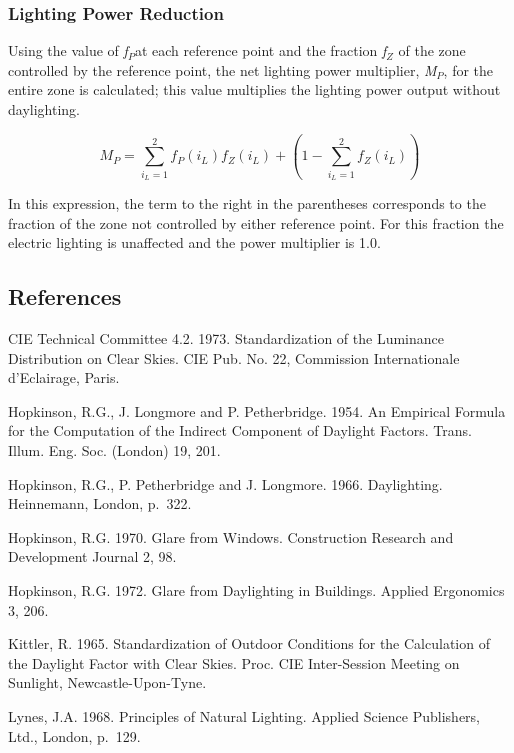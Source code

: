 \subsubsection{Lighting Power Reduction}\label{lighting-power-reduction}

Using the value of \emph{f\(_{P}\)}at each reference point and the fraction \emph{f\(_{Z}\)} of the zone controlled by the reference point, the net lighting power multiplier, \emph{M\(_{P}\)}, for the entire zone is calculated; this value multiplies the lighting power output without daylighting.

\begin{equation}
{M_P} = \sum\limits_{{i_L} = 1}^2 {{f_P}({i_L})} {f_Z}({i_L}) + \left( {1 - \sum\limits_{{i_L} = 1}^2 {} {f_Z}({i_L})} \right)
\end{equation}

In this expression, the term to the right in the parentheses corresponds to the fraction of the zone not controlled by either reference point. For this fraction the electric lighting is unaffected and the power multiplier is 1.0.

\subsection{References}\label{references-045}

CIE Technical Committee 4.2. 1973. Standardization of the Luminance Distribution on Clear Skies. CIE Pub. No. 22, Commission Internationale d'Eclairage, Paris.

Hopkinson, R.G., J. Longmore and P. Petherbridge. 1954. An Empirical Formula for the Computation of the Indirect Component of Daylight Factors. Trans. Illum. Eng. Soc. (London) 19, 201.

Hopkinson, R.G., P. Petherbridge and J. Longmore. 1966. Daylighting. Heinnemann, London, p.~322.

Hopkinson, R.G. 1970. Glare from Windows. Construction Research and Development Journal 2, 98.

Hopkinson, R.G. 1972. Glare from Daylighting in Buildings. Applied Ergonomics 3, 206.

Kittler, R. 1965. Standardization of Outdoor Conditions for the Calculation of the Daylight Factor with Clear Skies. Proc. CIE Inter-Session Meeting on Sunlight, Newcastle-Upon-Tyne.

Lynes, J.A. 1968. Principles of Natural Lighting. Applied Science Publishers, Ltd., London, p.~129.

